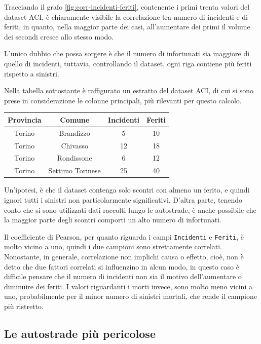 \documentclass[a4paper,12pt]{report}
\newcommand{\columnstyle}[1]{\texttt{#1}}
\begin{document}
Tracciando il grafo \ref{fig:corr-incidenti-feriti}, contenente i primi trenta valori 
del dataset ACI, è chiaramente visibile la correlazione tra 
numero di incidenti e di feriti, in quanto, nella maggior parte dei casi, 
all'aumentare dei primi il volume dei secondi cresce allo stesso modo. 

L'unico dubbio che possa sorgere è che il numero di infortunati sia maggiore di quello 
di incidenti, tuttavia, controllando il dataset, ogni 
riga contiene più feriti rispetto a sinistri. 

Nella tabella sottostante è raffigurato un estratto del dataset ACI, 
di cui si sono prese in considerazione le colonne principali, più 
rilevanti per questo calcolo. 

\begin{center}
    \def\arraystretch{1.5}%
    \begin{tabular}{ |c|c|c|c| } 
    \hline
    Provincia & Comune & Incidenti & Feriti \\ 
    \hline
    \rowcolor{TableGray}
    Torino & Brandizzo & 5 & 10\\
    Torino & Chivasso & 12 & 18\\
    \rowcolor{TableGray}
    Torino & Rondissone & 6 & 12\\
    Torino & Settimo Torinese & 25 & 40\\
    \hline
    \end{tabular}
\end{center}

Un'ipotesi, è che il dataset contenga solo scontri con almeno un ferito, 
e quindi ignori tutti i sinistri non particolarmente significativi. 
D'altra parte, tenendo conto che si sono utilizzati dati raccolti lungo 
le autostrade, è anche possibile che la maggior parte degli scontri comporti 
un alto numero di infortunati. 

Il coefficiente di Pearson, per quanto riguarda i campi \columnstyle{Incidenti} 
e \columnstyle{Feriti}, 
è molto vicino a uno, quindi i due campioni sono strettamente correlati. 
Nonostante, in generale, correlazione non implichi causa o effetto, cioè, non 
è detto che due fattori correlati si influenzino in alcun modo, in questo caso è 
difficile pensare che il numero di incidenti non sia il motivo dell'aumentare o diminuire 
dei feriti. 
I valori riguardanti i morti invece, sono molto meno vicini a uno, probabilmente 
per il minor numero di sinistri mortali, che rende il campione più ristretto. 

\subsection{Le autostrade più pericolose}
\end{document}
